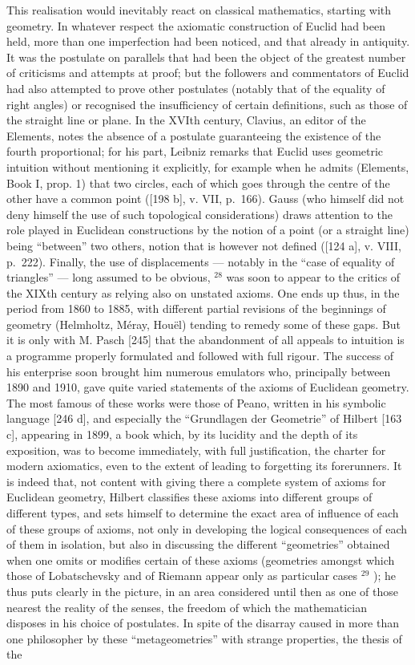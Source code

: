 This realisation would inevitably react on classical mathematics, starting with geometry. In whatever respect the axiomatic construction of Euclid had been held, more than one imperfection had been noticed, and that already in antiquity. It was the postulate on parallels that had been the object of the greatest number of criticisms and attempts at proof; but the followers and commentators of Euclid had also attempted to prove other postulates (notably that of the equality of right angles) or recognised the insufficiency of certain definitions, such as those of the straight line or plane. In the XVIth century, Clavius, an editor of the Elements, notes the absence of a postulate guaranteeing the existence of the fourth proportional; for his part, Leibniz remarks that Euclid uses geometric intuition without mentioning it explicitly, for example when he admits (Elements, Book I, prop. 1) that two circles, each of which goes through the centre of the other have a common point ({[}198 b{]}, v. VII, p.~166). Gauss (who himself did not deny himself the use of such topological considerations) draws attention to the role played in Euclidean constructions by the notion of a point (or a straight line) being ``between'' two others, notion that is however not defined ({[}124 a{]}, v. VIII, p.~222). Finally, the use of displacements --- notably in the ``case of equality of triangles'' --- long assumed to be obvious, \(^{28}\) was soon to appear to the critics of the XIXth century as relying also on unstated axioms. One ends up thus, in the period from 1860 to 1885, with different partial revisions of the beginnings of geometry (Helmholtz, Méray, Houël) tending to remedy some of these gaps. But it is only with M. Pasch {[}245{]} that the abandonment of all appeals to intuition is a programme properly formulated and followed with full rigour. The success of his enterprise soon brought him numerous emulators who, principally between 1890 and 1910, gave quite varied statements of the axioms of Euclidean geometry. The most famous of these works were those of Peano, written in his symbolic language {[}246 d{]}, and especially the ``Grundlagen der Geometrie'' of Hilbert {[}163 c{]}, appearing in 1899, a book which, by its lucidity and the depth of its exposition, was to become immediately, with full justification, the charter for modern axiomatics, even to the extent of leading to forgetting its forerunners. It is indeed that, not content with giving there a complete system of axioms for Euclidean geometry, Hilbert classifies these axioms into different groups of different types, and sets himself to determine the exact area of influence of each of these groups of axioms, not only in developing the logical consequences of each of them in isolation, but also in discussing the different ``geometries'' obtained when one omits or modifies certain of these axioms (geometries amongst which those of Lobatschevsky and of Riemann appear only as particular cases \(^{29}\) ); he thus puts clearly in the picture, in an area considered until then as one of those nearest the reality of the senses, the freedom of which the mathematician disposes in his choice of postulates. In spite of the disarray caused in more than one philosopher by these ``metageometries'' with strange properties, the thesis of the 